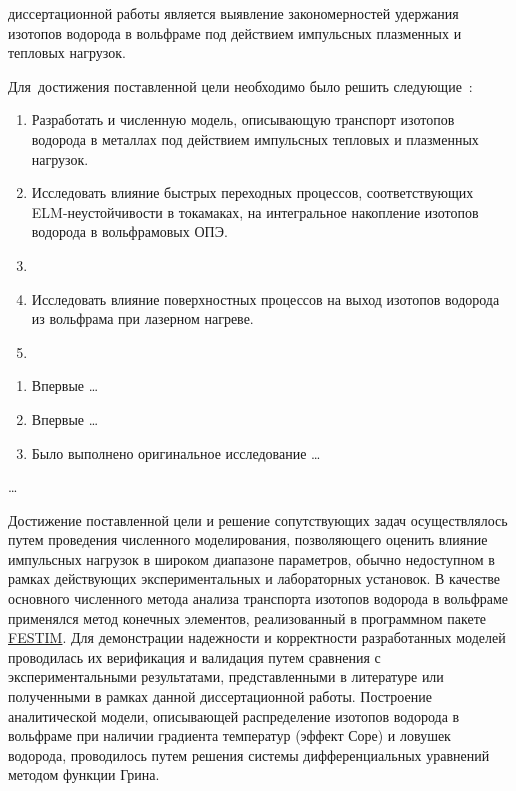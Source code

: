 {\aim} диссертационной работы является выявление закономерностей удержания изотопов водорода в вольфраме под действием импульсных плазменных и тепловых нагрузок.

Для~достижения поставленной цели необходимо было решить следующие~{\tasks}:
\begin{enumerate}[beginpenalty=10000] %
    \item Разработать и  численную модель, описывающую транспорт изотопов водорода в металлах 
    под действием импульсных тепловых и плазменных нагрузок.
    \item Исследовать влияние быстрых переходных процессов, соответствующих ELM-неустойчивости в токамаках, на интегральное накопление 
    изотопов водорода в вольфрамовых ОПЭ. 
    \item {}
    \item Исследовать влияние поверхностных процессов на выход изотопов водорода из вольфрама при лазерном нагреве. 
    \item {}
\end{enumerate}


{\novelty}
\begin{enumerate}[beginpenalty=10000] %
  \item Впервые \ldots
  \item Впервые \ldots
  \item Было выполнено оригинальное исследование \ldots
\end{enumerate}

{\influence} \ldots

{\methods} Достижение поставленной цели и решение сопутствующих задач осуществлялось путем проведения численного моделирования, 
позволяющего оценить влияние импульсных нагрузок в широком диапазоне параметров, обычно недоступном в рамках действующих экспериментальных 
и лабораторных установок. В качестве основного численного метода анализа транспорта изотопов водорода в вольфраме применялся 
метод конечных элементов, реализованный в программном пакете \href{https://github.com/festim-dev/FESTIM}{FESTIM}. Для демонстрации надежности и корректности 
разработанных моделей проводилась их верификация и валидация путем сравнения с экспериментальными результатами, представленными в литературе или полученными 
в рамках данной диссертационной работы. Построение аналитической модели, описывающей распределение изотопов водорода в вольфраме при наличии градиента 
температур (эффект Соре) и ловушек водорода, проводилось путем решения системы дифференциальных уравнений методом функции Грина.

